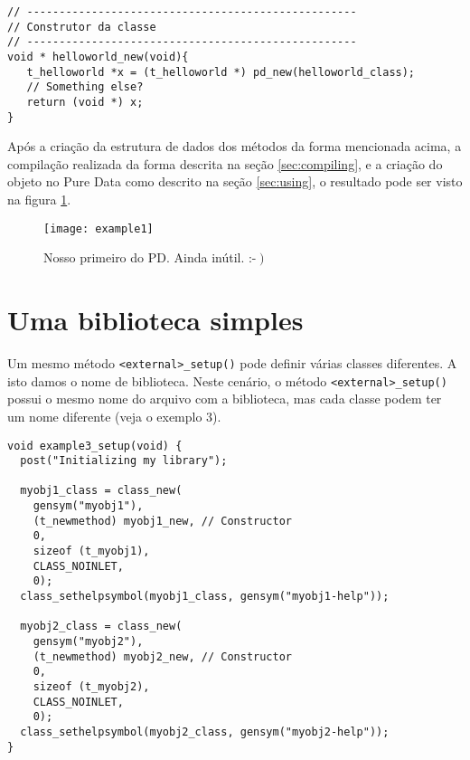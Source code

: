 \vspace{1em}
\begin{lstlisting}[caption=Construtor de uma classe]
// ---------------------------------------------------
// Construtor da classe
// ---------------------------------------------------
void * helloworld_new(void){
   t_helloworld *x = (t_helloworld *) pd_new(helloworld_class);
   // Something else?
   return (void *) x;
}
\end{lstlisting}

Após a criação da estrutura de dados dos métodos da forma mencionada acima, a
compilação realizada da forma descrita na seção \ref{sec:compiling}, e a
criação do objeto no Pure Data como descrito na seção \ref{sec:using}, o
resultado pode ser visto na figura \ref{fig:example01working}.

\begin{figure}[h!]
  \centering
  \texttt{[image: example1]}
  \caption{Nosso primeiro \external do PD. Ainda inútil. :-$\left.\right)$}
  \label{fig:example01working}
\end{figure}

\section{Uma biblioteca simples}

Um mesmo método \texttt{<external>\_setup()} pode definir várias classes
diferentes. A isto damos o nome de biblioteca. Neste cenário, o método
\texttt{<external>\_setup()} possui o mesmo nome do arquivo com a biblioteca,
mas cada classe podem ter um nome diferente (veja o exemplo 3).

\vspace{1em}
\begin{lstlisting}[caption=Exemplo de arquivo com duas classes]
void example3_setup(void) {
  post("Initializing my library");

  myobj1_class = class_new(
    gensym("myobj1"),
    (t_newmethod) myobj1_new, // Constructor
    0,
    sizeof (t_myobj1),
    CLASS_NOINLET,
    0);
  class_sethelpsymbol(myobj1_class, gensym("myobj1-help"));

  myobj2_class = class_new(
    gensym("myobj2"),
    (t_newmethod) myobj2_new, // Constructor
    0,
    sizeof (t_myobj2),
    CLASS_NOINLET,
    0);
  class_sethelpsymbol(myobj2_class, gensym("myobj2-help"));
}
\end{lstlisting}

